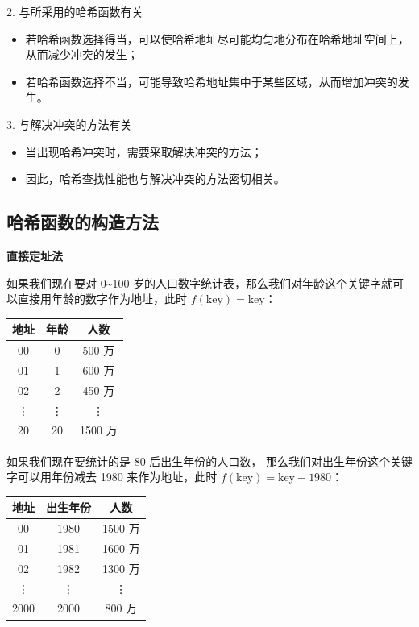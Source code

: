 \documentclass[lang=cn,newtx,10pt,scheme=chinese]{../elegantbook}
\begin{document}
  2. 与所采用的哈希函数有关  

     \begin{itemize}
       \item 若哈希函数选择得当，可以使哈希地址尽可能均匀地分布在哈希地址空间上，从而减少冲突的发生；
       \item 若哈希函数选择不当，可能导致哈希地址集中于某些区域，从而增加冲突的发生。
     \end{itemize}
  
  3. 与解决冲突的方法有关 

     \begin{itemize}
       \item 当出现哈希冲突时，需要采取解决冲突的方法；
       \item 因此，哈希查找性能也与解决冲突的方法密切相关。
     \end{itemize}
     
\subsection{哈希函数的构造方法}

\textbf{直接定址法}

如果我们现在要对 0\textasciitilde 100 岁的人口数字统计表，那么我们对年龄这个关键字就可以直接用年龄的数字作为地址，此时 $f(\text{key}) = \text{key}$：

\begin{center}
\begin{tabular}{|c|c|c|}
\hline
地址 & 年龄 & 人数 \\
\hline
00 & 0 & 500 万 \\
01 & 1 & 600 万 \\
02 & 2 & 450 万 \\
\vdots & \vdots & \vdots \\
20 & 20 & 1500 万 \\
\hline
\end{tabular}
\end{center}

如果我们现在要统计的是 80 后出生年份的人口数，
那么我们对出生年份这个关键字可以用年份减去 1980 来作为地址，此时 $f(\text{key}) = \text{key} - 1980$：

\begin{center}
\begin{tabular}{|c|c|c|}
\hline
地址 & 出生年份 & 人数 \\
\hline
00 & 1980 & 1500 万 \\
01 & 1981 & 1600 万 \\
02 & 1982 & 1300 万 \\
\vdots & \vdots & \vdots \\
2000 & 2000 & 800 万 \\
\hline
\end{tabular}
\end{center}
\end{document}
